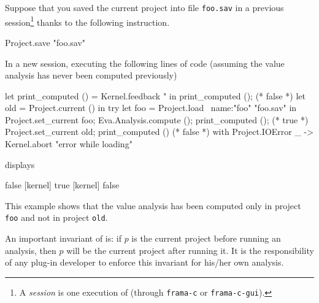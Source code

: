 \begin{example}\label{ex:set_current}
  Suppose that you saved the current project into file
  \texttt{foo.sav} in a previous \framac session\footnote{A
    \emph{session} is one execution of \framac (through \texttt{frama-c} or
    \texttt{frama-c-gui}).} thanks to the following
  instruction.
\begin{ocamlcode}
Project.save "foo.sav"
\end{ocamlcode}
In a new \framac session, executing the following lines of code (assuming the
value analysis has never been computed previously)
\begin{ocamlcode}
let print_computed () =
  Kernel.feedback "%
in
print_computed ();   (* false *)
let old = Project.current () in
try
  let foo = Project.load ~name:"foo" "foo.sav" in
  Project.set_current foo;
  Eva.Analysis.compute ();
  print_computed ();   (* true *)
  Project.set_current old;
  print_computed ()    (* false *)
with Project.IOError _ ->
  Kernel.abort "error while loading"
\end{ocamlcode}
displays
\begin{logs}
[kernel] false
[kernel] true
[kernel] false
\end{logs}
This example shows that the value analysis has been computed only in project
\texttt{foo} and not in project \texttt{old}.
\end{example}

\begin{important}
An important invariant of \framac is: if $p$ is the current project before
running an analysis, then $p$ will be the current project after running it. It
is the responsibility of any plug-in developer to enforce this invariant for
his/her own analysis.
\end{important}

